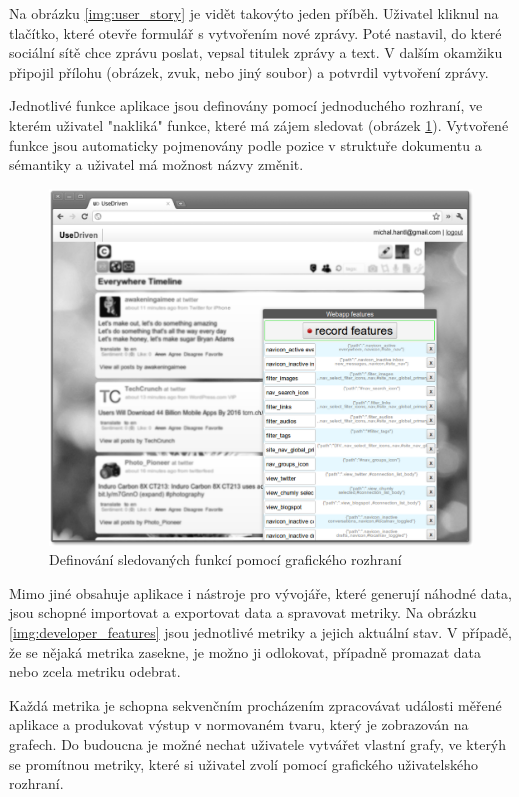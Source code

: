 \documentclass[bc,male,java,dept456]{diploma}						%
\begin{document}
Na obrázku \ref{img:user_story} je vidět takovýto jeden příběh. Uživatel kliknul na tlačítko, které otevře formulář s vytvořením nové zprávy. Poté nastavil, do které sociální sítě chce zprávu poslat, vepsal titulek zprávy a text. V dalším okamžiku připojil přílohu (obrázek, zvuk, nebo jiný soubor) a potvrdil vytvoření zprávy.

Jednotlivé funkce aplikace jsou definovány pomocí jednoduchého rozhraní, ve kterém uživatel "nakliká" funkce, které má zájem sledovat (obrázek \ref{img:define_features}). Vytvořené funkce jsou automaticky pojmenovány podle pozice v struktuře dokumentu a sémantiky a uživatel má možnost názvy změnit.

\begin{figure}[h]
	\centering
	\includegraphics[width=14cm]{img/ud_chumly_define_features_blurry_bw.pdf}
	\caption{Definování sledovaných funkcí pomocí grafického rozhraní}
	\label{img:define_features}
\end{figure}

Mimo jiné obsahuje aplikace i nástroje pro vývojáře, které generují náhodné data, jsou schopné importovat a exportovat data a spravovat metriky. Na obrázku \ref{img:developer_features} jsou jednotlivé metriky a jejich aktuální stav. V případě, že se nějaká metrika zasekne, je možno ji odlokovat, případně promazat data nebo zcela metriku odebrat.

Každá metrika je schopna sekvenčním procházením zpracovávat události měřené aplikace a produkovat výstup v normovaném tvaru, který je zobrazován na grafech. Do budoucna je možné nechat uživatele vytvářet vlastní grafy, ve kterýh se promítnou metriky, které si uživatel zvolí pomocí grafického uživatelského rozhraní.
\end{document}
